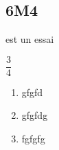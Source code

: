 \subsection*{6M4}


 est un essai

$\dfrac{3}{4}$

\begin{enumerate}
	\item gfgfd
	\item gfgfdg
	\item fgfgfg
\end{enumerate}
